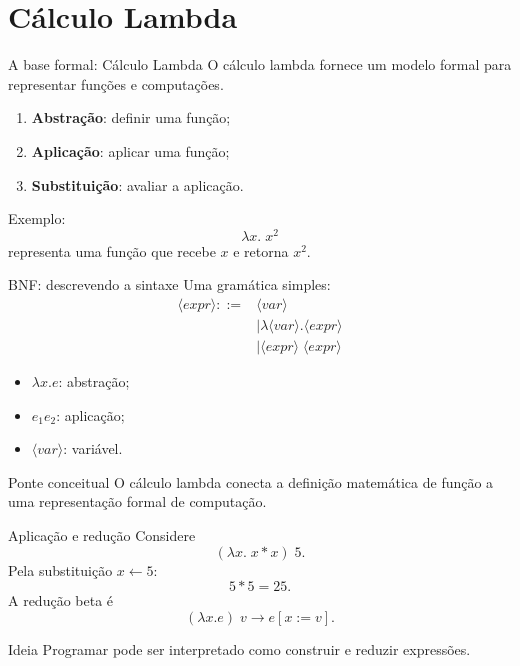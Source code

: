 \documentclass[aspectratio=169,11pt]{beamer}
\begin{document}
\section{Cálculo Lambda}

\begin{frame}{A base formal: Cálculo Lambda}
    O cálculo lambda fornece um modelo formal para representar funções e computações.
    \begin{enumerate}
        \item \textbf{Abstração}: definir uma função;
        \item \textbf{Aplicação}: aplicar uma função;
        \item \textbf{Substituição}: avaliar a aplicação.
    \end{enumerate}
    Exemplo:
    \[
        \lambda x.\;x^2
    \]
    representa uma função que recebe $x$ e retorna $x^2$.
\end{frame}

\begin{frame}{BNF: descrevendo a sintaxe}
    Uma gramática simples:
    \[
        \begin{aligned}
            \langle expr\rangle::={} & \langle var\rangle                                \\
                                     & \mid\lambda\langle var\rangle.\langle expr\rangle \\
                                     & \mid\langle expr\rangle\;\langle expr\rangle
        \end{aligned}
    \]
    \begin{itemize}
        \item $\lambda x.e$: abstração;
        \item $e_1e_2$: aplicação;
        \item $\langle var\rangle$: variável.
    \end{itemize}
    \begin{block}{Ponte conceitual}
        O cálculo lambda conecta a definição matemática de função a uma representação formal de computação.
    \end{block}
\end{frame}

\begin{frame}{Aplicação e redução}
    Considere
    \[
        (\lambda x.\;x*x)\;5.
    \]
    Pela substituição $x\leftarrow5$:
    \[
        5*5=25.
    \]
    A redução beta é
    \[
        (\lambda x.e)\;v\longrightarrow e[x:=v].
    \]
    \begin{block}{Ideia}
        Programar pode ser interpretado como construir e reduzir expressões.
    \end{block}
\end{frame}
\end{document}
